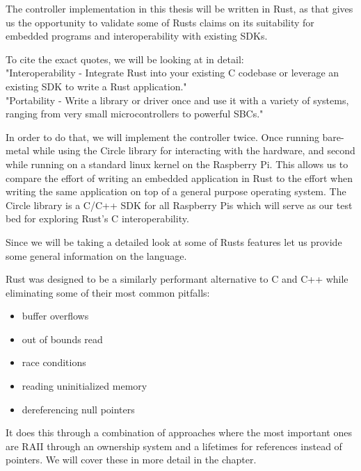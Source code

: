 The controller implementation in this thesis will be written in Rust,
as that gives us the opportunity to validate some of Rusts claims on its suitability for embedded programs and interoperability with existing SDKs.

To cite the exact quotes, we will be looking at in detail:\\
"Interoperability - Integrate Rust into your existing C codebase or leverage an existing SDK to write a Rust application."\\
"Portability - Write a library or driver once and use it with a variety of systems, ranging from very small microcontrollers to powerful SBCs."\\
\cite{RustEmbeddedSite}

In order to do that, we will implement the controller twice.
Once running bare-metal while using the Circle library for interacting with the hardware,
and second while running on a standard linux kernel on the Raspberry Pi.
This allows us to compare the effort of writing an embedded application in Rust to the effort
when writing the same application on top of a general purpose operating system.
The Circle library is a C/C++ SDK for all Raspberry Pis which will serve as our test bed for exploring Rust's C interoperability.

Since we will be taking a detailed look at some of Rusts features let us provide some general information on the language.

Rust was designed to be a similarly performant alternative to C and C++ while eliminating some of their most common pitfalls:
\begin{itemize}
    \item buffer overflows
    \item out of bounds read
    \item race conditions
    \item reading uninitialized memory
    \item dereferencing null pointers
\end{itemize}

It does this through a combination of approaches where the most important ones are RAII through an ownership system and a lifetimes for references instead of pointers.
We will cover these in more detail in the  chapter.
